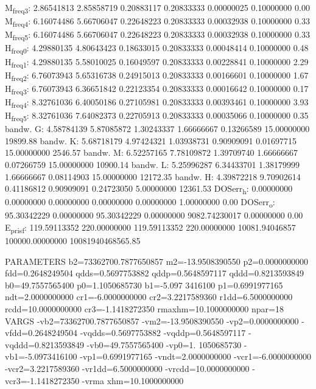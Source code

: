 \documentclass[11pt]{article}
\begin{document}
M\textsubscript{freq}\textsubscript{3}:   2.86541813   2.85858719   0.20883117   0.20833333   0.00000025   0.10000000         0.00
M\textsubscript{freq}\textsubscript{4}:   6.16074486   5.66706047   0.22648223   0.20833333   0.00032938   0.10000000         0.33
M\textsubscript{freq}\textsubscript{5}:   6.16074486   5.66706047   0.22648223   0.20833333   0.00032938   0.10000000         0.33
H\textsubscript{freq}\textsubscript{0}:   4.29880135   4.80643423   0.18633015   0.20833333   0.00048414   0.10000000         0.48
H\textsubscript{freq}\textsubscript{1}:   4.29880135   5.58010025   0.16049597   0.20833333   0.00228841   0.10000000         2.29
H\textsubscript{freq}\textsubscript{2}:   6.76073943   5.65316738   0.24915013   0.20833333   0.00166601   0.10000000         1.67
H\textsubscript{freq}\textsubscript{3}:   6.76073943   6.36651842   0.22123354   0.20833333   0.00016642   0.10000000         0.17
H\textsubscript{freq}\textsubscript{4}:   8.32761036   6.40050186   0.27105981   0.20833333   0.00393461   0.10000000         3.93
H\textsubscript{freq}\textsubscript{5}:   8.32761036   7.64082373   0.22705913   0.20833333   0.00035066   0.10000000         0.35
bandw. G:   4.58784139   5.87085872   1.30243337   1.66666667   0.13266589  15.00000000     19899.88
bandw. K:   5.68718179   4.97424321   1.03938731   0.90909091   0.01697715  15.00000000      2546.57
bandw. M:   6.52257165   7.78109872   1.39709740   1.66666667   0.07266759  15.00000000     10900.14
bandw. L:   5.25996287   6.34433701   1.38179999   1.66666667   0.08114903  15.00000000     12172.35
bandw. H:   4.39872218   9.70902614   0.41186812   0.90909091   0.24723050   5.00000000     12361.53
DOSerr\textsubscript{h}:   0.00000000   0.00000000   0.00000000   0.00000000   0.00000000   1.00000000         0.00
DOSerr\textsubscript{o}:  95.30342229   0.00000000  95.30342229   0.00000000 9082.74230017   0.00000000         0.00
E\textsubscript{pris}\textsubscript{f}: 119.59113352 220.00000000 119.59113352 220.00000000 10081.94046857 100000.00000000 10081940468565.85





PARAMETERS
  b2=73362700.7877650857 m2=-13.9508390550 p2=0.0000000000 fdd=0.2648249504 qdds=0.5697753882 qddp=0.5648597117 qddd=0.8213593849 b0=49.7557565400 p0=1.1050685730 b1=-5.097
3416100 p1=0.6991977165 ndt=2.0000000000 cr1=-6.0000000000 cr2=3.2217589360 r1dd=6.5000000000 rcdd=10.0000000000 cr3=-1.1418272350 rmaxhm=10.1000000000 npar=18 
VARGS
    -vb2=73362700.7877650857 -vm2=-13.9508390550 -vp2=0.0000000000 -vfdd=0.2648249504 -vqdds=0.5697753882 -vqddp=0.5648597117 -vqddd=0.8213593849 -vb0=49.7557565400 -vp0=1.
1050685730 -vb1=-5.0973416100 -vp1=0.6991977165 -vndt=2.0000000000 -vcr1=-6.0000000000 -vcr2=3.2217589360 -vr1dd=6.5000000000 -vrcdd=10.0000000000 -vcr3=-1.1418272350 -vrma
xhm=10.1000000000 
\end{document}
